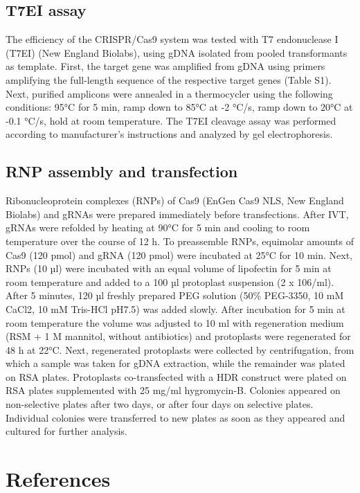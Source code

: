 \documentclass[onecolumn, 11pt,openany]{memoir}
\begin{document}
\begin{multicols}{2}
\begin{footnotesize}
\subsection{T7EI assay}
The efficiency of the CRISPR/Cas9 system was tested with T7 endonuclease I (T7EI) (New England Biolabs), using gDNA isolated from pooled transformants as template. First, the target gene was amplified from gDNA using primers amplifying the full-length sequence of the respective target genes (Table S1). Next, purified amplicons were annealed in a thermocycler using the following conditions: 95°C for 5 min, ramp down to 85°C at -2 °C/s, ramp down to 20°C at -0.1 °C/s, hold at room temperature. The T7EI cleavage assay was performed according to manufacturer’s instructions and analyzed by gel electrophoresis. 

\subsection{RNP assembly and transfection}
Ribonucleoprotein complexes (RNPs) of Cas9 (EnGen Cas9 NLS, New England Biolabs) and gRNAs were prepared immediately before transfections. After IVT, gRNAs were refolded by heating at 90°C for 5 min and cooling to room temperature over the course of 12 h. To preassemble RNPs, equimolar amounts of Cas9 (120 pmol) and gRNA (120 pmol) were incubated at 25°C for 10 min. Next, RNPs (10 µl) were incubated with an equal volume of lipofectin for 5 min at room temperature and added to a 100 µl protoplast suspension (2 x 106/ml). After 5 minutes, 120 µl freshly prepared PEG solution (50\% PEG-3350, 10 mM CaCl2, 10 mM Tris-HCl pH7.5) was added slowly. After incubation for 5 min at room temperature the volume was adjusted to 10 ml with regeneration medium (RSM + 1 M mannitol, without antibiotics) and protoplasts were regenerated for 48 h at 22°C. Next, regenerated protoplasts were collected by centrifugation, from which a sample was taken for gDNA extraction, while the remainder was plated on RSA plates. Protoplasts co-transfected with a HDR construct were plated on RSA plates supplemented with 25 mg/ml hygromycin-B. Colonies appeared on non-selective plates after two days, or after four days on selective plates. Individual colonies were transferred to new plates as soon as they appeared and cultured for further analysis.

\end{footnotesize}

\section{References}
\setlength\parindent{-0.5 em}
\setlength{\parskip}{0 em}
\setlength{\leftskip}{0.5 em}


\end{multicols}
\end{document}
